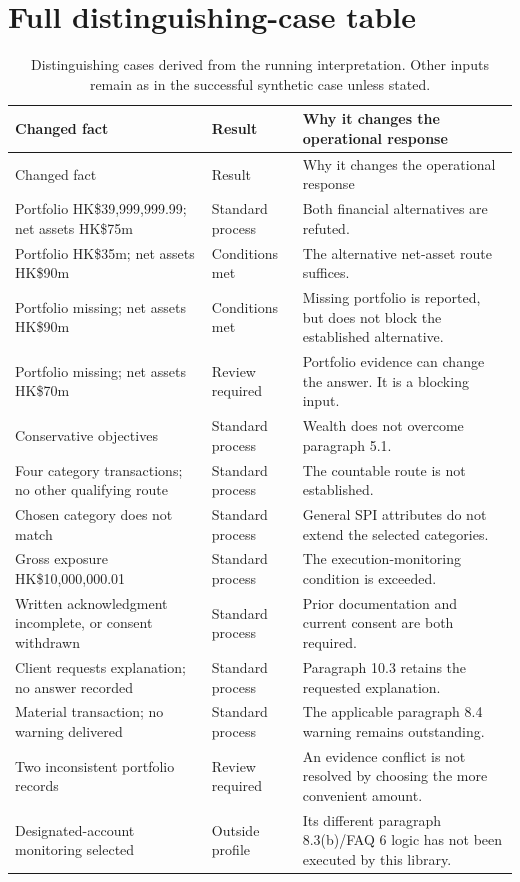 \documentclass[12pt,a4paper,oneside,openany]{book}
\begin{document}
\section{Full distinguishing-case table}
\begingroup\small
\begin{longtable}{P{0.38\textwidth}P{0.19\textwidth}P{0.33\textwidth}}
\caption{Distinguishing cases derived from the running interpretation. Other
inputs remain as in the successful synthetic case unless stated.}\label{tab:dry-cases}\\
\toprule Changed fact & Result & Why it changes the operational response \\\midrule
\endfirsthead
\toprule Changed fact & Result & Why it changes the operational response \\\midrule
\endhead
Portfolio HK\$39,999,999.99; net assets HK\$75m & Standard process & Both financial alternatives are refuted.\\
Portfolio HK\$35m; net assets HK\$90m & Conditions met & The alternative net-asset route suffices.\\
Portfolio missing; net assets HK\$90m & Conditions met & Missing portfolio is reported, but does not block the established alternative.\\
Portfolio missing; net assets HK\$70m & Review required & Portfolio evidence can change the answer. It is a blocking input.\\
Conservative objectives & Standard process & Wealth does not overcome paragraph 5.1.\\
Four category transactions; no other qualifying route & Standard process & The countable route is not established.\\
Chosen category does not match & Standard process & General SPI attributes do not extend the selected categories.\\
Gross exposure HK\$10,000,000.01 & Standard process & The execution-monitoring condition is exceeded.\\
Written acknowledgment incomplete, or consent withdrawn & Standard process & Prior documentation and current consent are both required.\\
Client requests explanation; no answer recorded & Standard process & Paragraph 10.3 retains the requested explanation.\\
Material transaction; no warning delivered & Standard process & The applicable paragraph 8.4 warning remains outstanding.\\
Two inconsistent portfolio records & Review required & An evidence conflict is not resolved by choosing the more convenient amount.\\
Designated-account monitoring selected & Outside profile & Its different paragraph 8.3(b)/FAQ 6 logic has not been executed by this library.\\
\bottomrule
\end{longtable}
\endgroup
\end{document}
